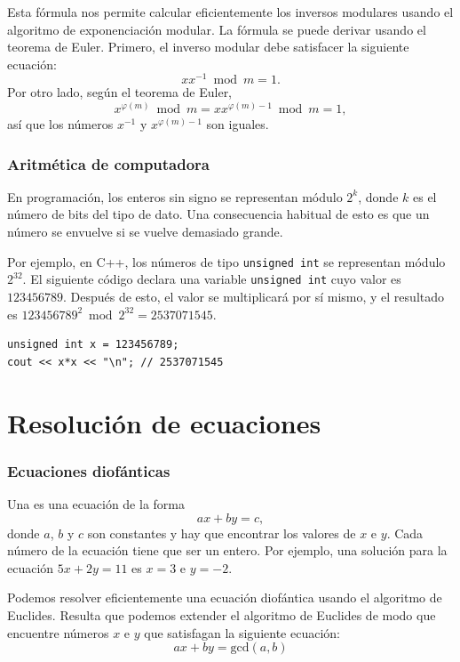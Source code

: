 Esta fórmula nos permite calcular eficientemente
los inversos modulares usando el algoritmo de exponenciación modular.
La fórmula se puede derivar usando el teorema de Euler.
Primero, el inverso modular debe satisfacer la siguiente ecuación:
\[
x x^{-1} \bmod m = 1.
\]
Por otro lado, según el teorema de Euler,
\[
x^{\varphi(m)} \bmod m =  xx^{\varphi(m)-1} \bmod m = 1,
\]
así que los números $x^{-1}$ y $x^{\varphi(m)-1}$ son iguales.

\subsubsection{Aritmética de computadora}

En programación, los enteros sin signo se representan módulo $2^k$,
donde $k$ es el número de bits del tipo de dato.
Una consecuencia habitual de esto es que un número se envuelve
si se vuelve demasiado grande.

Por ejemplo, en C++, los números de tipo \texttt{unsigned int}
se representan módulo $2^{32}$.
El siguiente código declara una variable
\texttt{unsigned int} cuyo valor es $123456789$.
Después de esto, el valor se multiplicará por sí mismo,
y el resultado es
$123456789^2 \bmod 2^{32} = 2537071545$.

\begin{lstlisting}
unsigned int x = 123456789;
cout << x*x << "\n"; // 2537071545
\end{lstlisting}

\section{Resolución de ecuaciones}

\subsubsection*{Ecuaciones diofánticas}


Una 
es una ecuación de la forma
\[ ax + by = c, \]
donde $a$, $b$ y $c$ son constantes
y hay que encontrar los valores de $x$ e $y$.
Cada número de la ecuación tiene que ser un entero.
Por ejemplo, una solución para la ecuación
$5x+2y=11$ es $x=3$ e $y=-2$.


Podemos resolver eficientemente una ecuación diofántica
usando el algoritmo de Euclides.
Resulta que podemos extender el algoritmo de Euclides
de modo que encuentre números $x$ e $y$
que satisfagan la siguiente ecuación:
\[
ax + by = \textrm{gcd}(a,b)
\]

